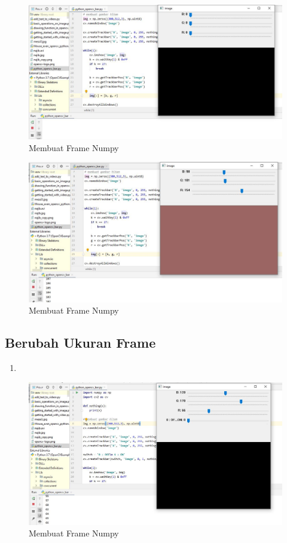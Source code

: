 \begin{figure}[ht]
\centering
\includegraphics[scale=0.5]{figures/2,31.jpg}
\caption{Membuat Frame Numpy}
\label{contoh}
\end{figure}

\begin{figure}[ht]
\centering
\includegraphics[scale=0.5]{figures/2,31,1.jpg}
\caption{Membuat Frame Numpy}
\label{contoh}
\end{figure}



\newpage
\subsection{Berubah Ukuran Frame}

\begin{enumerate}
	\item
\end{enumerate}

\begin{figure}[ht]
\centering
\includegraphics[scale=0.5]{figures/2,32.jpg}
\caption{Membuat Frame Numpy}
\label{contoh}
\end{figure}

